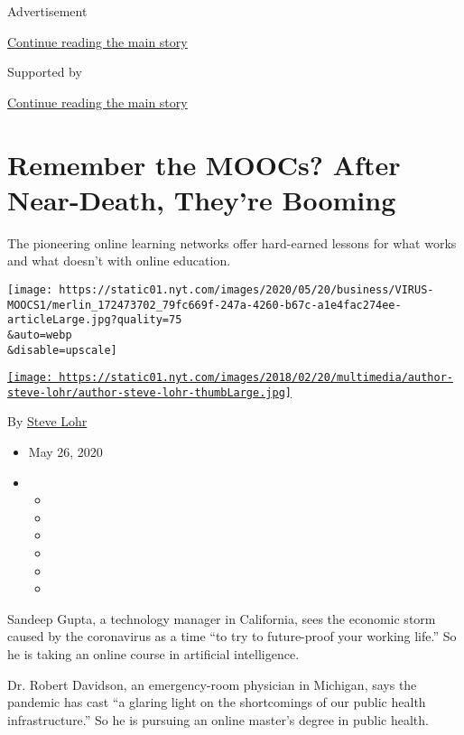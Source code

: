 Advertisement

\protect\hyperlink{after-top}{Continue reading the main story}

Supported by

\protect\hyperlink{after-sponsor}{Continue reading the main story}

\hypertarget{remember-the-moocs-after-near-death-theyre-booming}{%
\section{Remember the MOOCs? After Near-Death, They're
Booming}\label{remember-the-moocs-after-near-death-theyre-booming}}

The pioneering online learning networks offer hard-earned lessons for
what works and what doesn't with online education.

\texttt{[image: https://static01.nyt.com/images/2020/05/20/business/VIRUS-MOOCS1/merlin\_172473702\_79fc669f-247a-4260-b67c-a1e4fac274ee-articleLarge.jpg?quality=75\\\&auto=webp\\\&disable=upscale]}

\href{https://www.nytimes.com/by/steve-lohr}{\texttt{[image: https://static01.nyt.com/images/2018/02/20/multimedia/author-steve-lohr/author-steve-lohr-thumbLarge.jpg]}}

By \href{https://www.nytimes.com/by/steve-lohr}{Steve Lohr}

\begin{itemize}
\item
  May 26, 2020
\item
  \begin{itemize}
  \item
  \item
  \item
  \item
  \item
  \item
  \end{itemize}
\end{itemize}

Sandeep Gupta, a technology manager in California, sees the economic
storm caused by the coronavirus as a time ``to try to future-proof your
working life.'' So he is taking an online course in artificial
intelligence.

Dr. Robert Davidson, an emergency-room physician in Michigan, says the
pandemic has cast ``a glaring light on the shortcomings of our public
health infrastructure.'' So he is pursuing an online master's degree in
public health.

